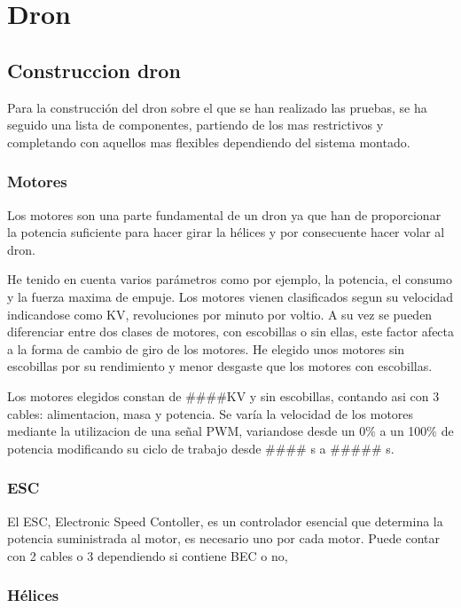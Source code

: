 \documentclass[spanish]{book}
\begin{document}
            
        
        \section{Dron}
            \subsection{Construccion dron}
            Para la construcción del dron sobre el que se han realizado las pruebas, se ha seguido una lista de componentes, partiendo de los mas restrictivos y completando con aquellos mas flexibles dependiendo del sistema montado.
                \subsubsection{Motores}
                Los motores son una parte fundamental de un dron ya que han de proporcionar la potencia suficiente para hacer girar la hélices y por consecuente hacer volar al dron. 
                
                He tenido en cuenta varios parámetros como por ejemplo, la potencia, el consumo y la fuerza maxima de empuje. Los motores vienen clasificados segun su velocidad indicandose como KV, revoluciones por minuto por voltio. A su vez se pueden diferenciar entre dos clases de motores, con escobillas o sin ellas, este factor afecta a la forma de cambio de giro de los motores. He elegido unos motores sin escobillas por su rendimiento y menor desgaste que los motores con escobillas. 
                
                Los motores elegidos constan de ####KV y sin escobillas, contando asi con 3 cables: alimentacion, masa y potencia. Se varía la velocidad de los motores mediante la utilizacion de una señal PWM, variandose desde un 0\% a un 100\% de potencia modificando su ciclo de trabajo desde #### s a ##### s.
                \subsubsection{ESC}
                El ESC, Electronic Speed Contoller, es un controlador esencial que determina la potencia suministrada al motor, es necesario uno por cada motor. Puede contar con 2 cables o 3 dependiendo si contiene BEC o no, 
                \subsubsection{Hélices}
\end{document}
